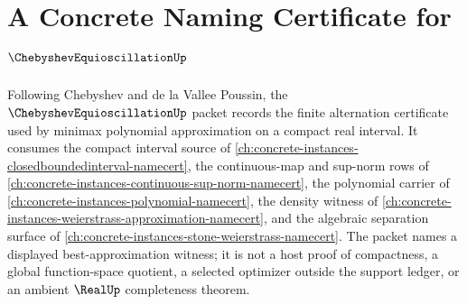 \chapter{A Concrete Naming Certificate for $\ChebyshevEquioscillationUp$}
\label{ch:concrete-instances-chebyshev-equioscillation-namecert}

Following Chebyshev and de la Vallee Poussin, the $\ChebyshevEquioscillationUp$ packet records the finite alternation certificate used by minimax polynomial approximation on a compact real interval. It consumes the compact interval source of \autoref{ch:concrete-instances-closedboundedinterval-namecert}, the continuous-map and sup-norm rows of \autoref{ch:concrete-instances-continuous-sup-norm-namecert}, the polynomial carrier of \autoref{ch:concrete-instances-polynomial-namecert}, the density witness of \autoref{ch:concrete-instances-weierstrass-approximation-namecert}, and the algebraic separation surface of \autoref{ch:concrete-instances-stone-weierstrass-namecert}. The packet names a displayed best-approximation witness; it is not a host proof of compactness, a global function-space quotient, a selected optimizer outside the support ledger, or an ambient $\RealUp$ completeness theorem.

